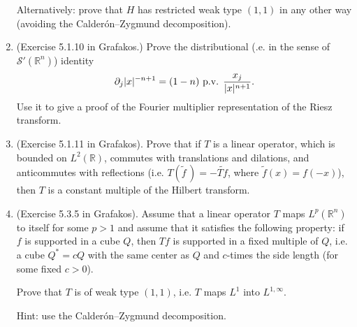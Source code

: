 \documentclass[a4paper]{article}
\begin{document}
\begin{enumerate}
Alternatively: prove that $H$ has  restricted weak type $(1,1)$ in any other way (avoiding the Calder\'{o}n--Zygmund decomposition).

\item (Exercise 5.1.10 in Grafakos.)  Prove the distributional (.e. in the sense of $\mathcal S' (\mathbb R^n)$) identity $$ \partial_j |x|^{-n+1}  = (1-n) \textup{ p.v. } \frac{x_j}{|x|^{n+1}}.$$ Use it to give a proof of the Fourier multiplier representation of the Riesz transform.

\item (Exercise 5.1.11 in Grafakos). Prove that if $T$ is a linear operator, which is bounded on $L^2 (\mathbb R)$, commutes with translations and dilations, and anticommutes with reflections (i.e. $ T (\widetilde{f}\,) = - \widetilde{Tf}$, where $\widetilde{f} (x) = f (-x)$), then $T$ is a constant multiple of the Hilbert transform.

\item (Exercise 5.3.5 in Grafakos). Assume that a linear operator  $ T$ maps $L^p (\mathbb R^n)$ to itself for some $p >1$ and assume that it satisfies the following property: if $f$ is supported in a cube $Q$, then $Tf$ is supported in a fixed multiple of $Q$, i.e. a cube $Q^* = c Q$ with the same center as $Q$ and $c$-times the side length (for some fixed $c>0$).

Prove that $T$ is of weak type $(1,1)$, i.e. $T$ maps $L^1$ into $L^{1,\infty}$.

Hint: use the Calder\'{o}n--Zygmund decomposition.

\end{enumerate}
\end{document}
